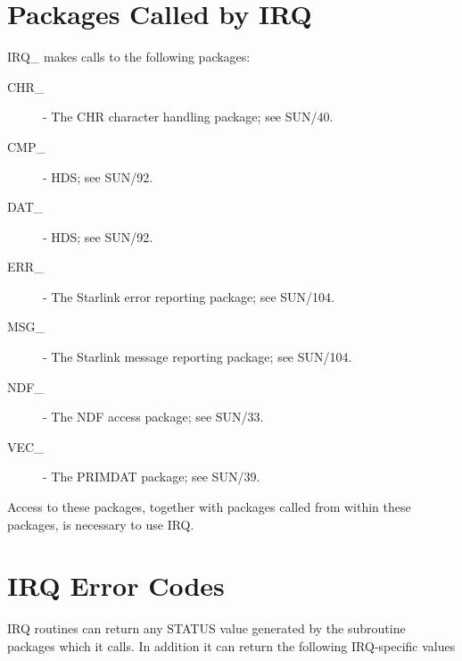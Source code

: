 \section {Packages Called by IRQ}
IRQ\_ makes calls to the following packages:
\begin {description}
\item [CHR\_] - The CHR character handling package; see SUN/40.
\item [CMP\_] - HDS; see SUN/92.
\item [DAT\_] - HDS; see SUN/92.
\item [ERR\_] - The Starlink error reporting package; see SUN/104.
\item [MSG\_] - The Starlink message reporting package; see SUN/104.
\item [NDF\_] - The NDF access package; see SUN/33.
\item [VEC\_] - The PRIMDAT package; see SUN/39.
\end{description}

Access to these packages, together with packages called from within these
packages, is necessary to use IRQ.

\section {IRQ Error Codes}
\label {APP:ERRORS}
IRQ routines can return any STATUS value generated by the subroutine packages
which it calls. In addition it can return the following IRQ-specific values

